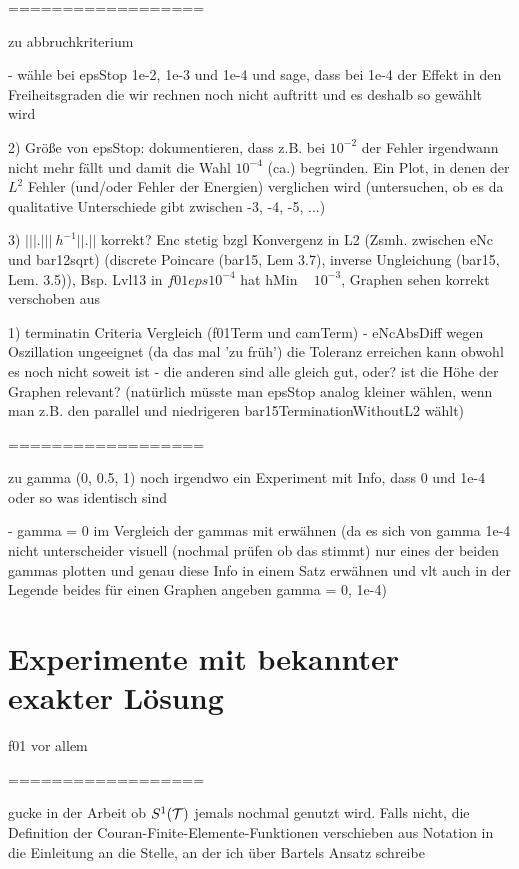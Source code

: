 ==================

zu abbruchkriterium

  - wähle bei epsStop 1e-2, 1e-3 und 1e-4 und sage, dass bei 1e-4 der Effekt 
    in den Freiheitsgraden die wir rechnen noch nicht auftritt und es deshalb
    so gewählt wird

2) Größe von epsStop: dokumentieren, dass z.B. bei $10^{-2}$ der Fehler irgendwann
nicht mehr fällt und damit die Wahl $10^{-4}$ (ca.) begründen.
Ein Plot, in denen der $L^2$ Fehler (und/oder Fehler der Energien) verglichen wird
(untersuchen, ob es da qualitative Unterschiede gibt zwischen -3, -4, -5, ...)

3) $|||.||| ~ h^{-1} ||.||$ korrekt? Enc stetig bzgl Konvergenz in L2 (Zsmh. 
   zwischen eNc und bar12sqrt)
   (discrete Poincare (bar15, Lem 3.7), inverse Ungleichung (bar15, Lem. 3.5)),
   Bsp. Lvl13 in $f01eps10^{-4}$ hat hMin ~ $10^{-3}$, Graphen sehen korrekt
   verschoben aus


1) terminatin Criteria Vergleich (f01Term und camTerm)
    - eNcAbsDiff wegen Oszillation ungeeignet (da das mal 'zu früh') die 
      Toleranz erreichen kann obwohl es noch nicht soweit ist
    - die anderen sind alle gleich gut, oder? ist die Höhe der Graphen relevant?
      (natürlich müsste man epsStop analog kleiner wählen, wenn man z.B. den
      parallel und niedrigeren bar15TerminationWithoutL2 wählt)

==================

zu gamma (0, 0.5, 1) noch irgendwo ein Experiment mit Info, dass 0 und 1e-4 oder
so was identisch sind

  - gamma = 0 im Vergleich der gammas mit erwähnen (da es sich von gamma 1e-4
    nicht unterscheider visuell (nochmal prüfen ob das stimmt) nur eines der
    beiden gammas plotten und genau diese Info in einem Satz erwähnen und vlt
    auch in der Legende beides für einen Graphen angeben gamma = 0, 1e-4)


\section{Experimente mit bekannter exakter Lösung}

f01 vor allem

==================

gucke in der Arbeit ob $S^1(\mathcal{T})$ jemals nochmal genutzt wird. Falls nicht,
die Definition der Couran-Finite-Elemente-Funktionen verschieben aus Notation
in die Einleitung an die Stelle, an der ich über Bartels Ansatz schreibe

